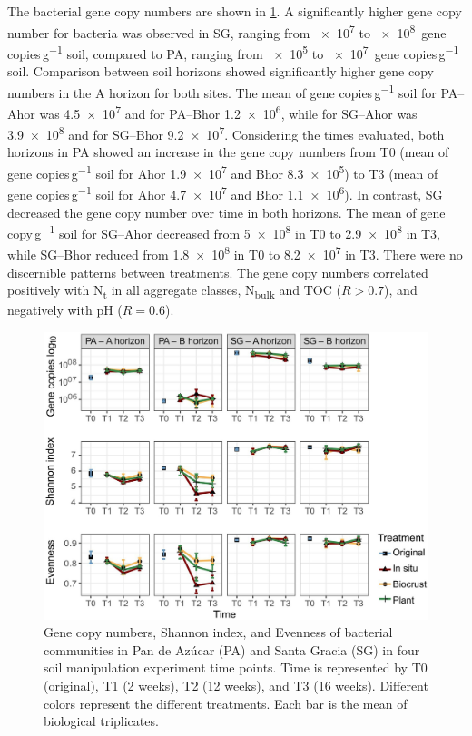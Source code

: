 The bacterial gene copy numbers are shown in \ref{fig:M3-F3}. A significantly higher gene copy number for bacteria was observed in SG, ranging from \num{e7} to \num{e8}~gene copies\,\si{\gram^{-1}} soil, compared to PA, ranging from \num{e5} to \num{e7}~gene copies\,\si{\gram^{-1}} soil. Comparison between soil horizons showed significantly higher gene copy numbers in the A horizon for both sites. The mean of gene copies\,\si{\gram^{-1}} soil for PA--Ahor was \num{4.5e7} and for PA--Bhor \num{1.2e6}, while for SG--Ahor was \num{3.9e8} and for SG--Bhor \num{9.2e7}. Considering the times evaluated, both horizons in PA showed an increase in the gene copy numbers from T0 (mean of gene copies\,\si{\gram^{-1}} soil for Ahor \num{1.9e7} and Bhor \num{8.3e5}) to T3 (mean of gene copies\,\si{\gram^{-1}} soil for Ahor \num{4.7e7} and Bhor \num{1.1e6}). In contrast, SG decreased the gene copy number over time in both horizons. The mean of gene copy\,\si{\gram^{-1}} soil for SG--Ahor decreased from \num{5e8} in T0 to \num{2.9e8} in T3, while SG--Bhor reduced from \num{1.8e8} in T0 to \num{8.2e7} in T3. There were no discernible patterns between treatments. The gene copy numbers correlated positively with N\textsubscript{t} in all aggregate classes, N\textsubscript{bulk} and TOC (\(R > 0.7\)), and negatively with pH (\(R = 0.6\)).

\begin{figure}[H]
	\centering
	\includegraphics[width=1\textwidth]{img/M3-Figure_3.jpg}
	\caption{Gene copy numbers, Shannon index, and Evenness of bacterial communities in Pan de Azúcar (PA) and Santa Gracia (SG) in four soil manipulation experiment time points. Time is represented by T0 (original), T1 (2 weeks), T2 (12 weeks), and T3 (16 weeks). Different colors represent the different treatments. Each bar is the mean of biological triplicates.}
	\label{fig:M3-F3}
\end{figure}

